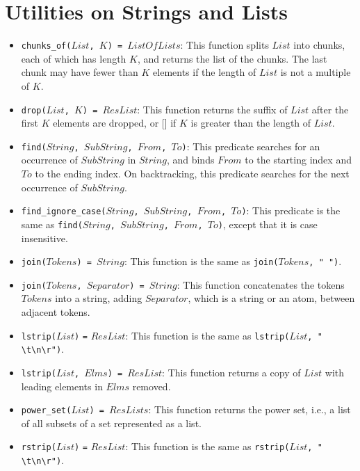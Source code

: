 \section{Utilities on Strings and Lists}
\begin{itemize}
\item \texttt{chunks\_of($List$, $K$) = $ListOfLists$}: This function splits $List$ into chunks, each of which has length $K$, and returns the list of the chunks. The last chunk may have fewer than $K$ elements if the length of $List$ is not a multiple of $K$.
\item \texttt{drop($List$, $K$) = $ResList$}: This function returns the suffix of $List$ after the first $K$ elements are dropped, or [] if $K$ is greater than the length of $List$.
\item \texttt{find($String$, $SubString$, $From$, $To$)}: This predicate searches for an occurrence of $SubString$ in $String$, and binds $From$ to the starting index and $To$ to the ending index. On backtracking, this predicate searches for the next occurrence of $SubString$.
\item \texttt{find\_ignore\_case($String$, $SubString$, $From$, $To$)}: This predicate is the same as \texttt{find($String$, $SubString$, $From$, $To$)}, except that it is case insensitive.
\item \texttt{join($Tokens$) = $String$}: This function is the same as \texttt{join($Tokens$, " ")}.
\item \texttt{join($Tokens$, $Separator$) = $String$}: This function concatenates the tokens $Tokens$ into a string, adding $Separator$, which is a string or an atom, between adjacent tokens.
\item \texttt{lstrip($List$)} \texttt{=} \texttt{$ResList$}: This function is the same as \texttt{lstrip($List$, }\verb+" \t\n\r")+. 
\item \texttt{lstrip($List$, $Elms$) = $ResList$}: This function returns a copy of $List$ with leading  elements in $Elms$ removed.
\item \texttt{power\_set($List$) = $ResLists$}: This function returns the power set, i.e., a list of all subsets of a set represented as a list.
\item \texttt{rstrip($List$)} \texttt{=} \texttt{$ResList$}: This function is the same as \texttt{rstrip($List$, }\verb+" \t\n\r")+.

\end{itemize}
